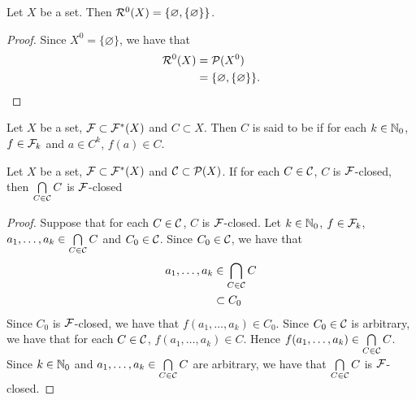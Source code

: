 \documentclass{book}
\begin{document}
   \begin{ex}
   	Let $X$ be a set. Then $\mathcal{R}^0(X) = \{\varnothing, \{\varnothing\}\}$.
   \end{ex}
   
   \begin{proof}
   	Since $X^0 = \{\varnothing\}$, we have that 
   	\begin{align*}
   		\mathcal{R}^0(X)
   		& = \mathcal{P}(X^0) \\
   		& = \{\varnothing, \{\varnothing\}\}.
   	\end{align*}
   \end{proof}
   
   \begin{defn}
   	Let $X$ be a set, $\mathcal{F} \subset \mathcal{F}^*(X)$ and $C \subset X$. Then $C$ is said to be   if for each $k \in \mathbb{N}_0$, $f \in \mathcal{F}_k$ and $a \in C^k$, $f(a) \in C$.
   \end{defn}
   
   \begin{ex}
   	Let $X$ be a set, $\mathcal{F} \subset \mathcal{F}^*(X)$ and $\mathcal{C} \subset \mathcal{P}(X)$. If for each $C \in \mathcal{C}$, $C$ is  $\mathcal{F}$-closed, then $\bigcap\limits_{C \in \mathcal{C}} C$ is $\mathcal{F}$-closed
   \end{ex}
   
   \begin{proof}
   	Suppose that for each $C \in \mathcal{C}$, $C$ is  $\mathcal{F}$-closed. Let $k \in \mathbb{N}_0$, $f \in \mathcal{F}_k$, $a_1, \ldots, a_k \in \bigcap\limits_{C \in \mathcal{C}} C$ and $C_0 \in \mathcal{C}$. Since $C_0 \in \mathcal{C}$, we have that 
   	\begin{align*}
   		a_1, \ldots, a_k 
   		& \in \bigcap_{C \in \mathcal{C}} C \\
   		& \subset C_0
   	\end{align*}
   	Since $C_0$ is $\mathcal{F}$-closed, we have that $f(a_1, \ldots, a_k) \in C_0$. Since $C_0 \in \mathcal{C}$ is arbitrary, we have that for each $C \in \mathcal{C}$, $f(a_1, \ldots, a_k) \in C$. Hence $f(a_1, \ldots, a_k) \in \bigcap\limits_{C \in \mathcal{C}} C$. Since $k \in \mathbb{N}_0$ and $a_1, \ldots, a_k \in \bigcap\limits_{C \in \mathcal{C}} C$ are arbitrary, we have that $\bigcap\limits_{C \in \mathcal{C}} C$ is $\mathcal{F}$-closed.
   \end{proof}
\end{document}
